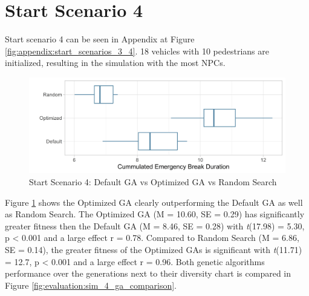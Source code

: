 \section{Start Scenario 4}
Start scenario 4 can be seen in Appendix at Figure \ref{fig:appendix:start_scenarios_3_4}. 18 vehicles with 10 pedestrians are initialized, resulting in the simulation with the most NPCs.

\begin{figure}[ht] 
	\includegraphics[width=1\linewidth]{simulations/evaluation/plots/sim_4_comparison}
	\caption{Start Scenario 4: Default GA vs Optimized GA vs Random Search}
	\label{fig:evaluation:sim_4_comparison}
\end{figure}

Figure \ref{fig:evaluation:sim_4_comparison} shows the Optimized GA clearly outperforming the Default GA as well as Random Search.
The Optimized GA (M = 10.60, SE = 0.29) has significantly greater fitness then the Default GA (M = 8.46, SE = 0.28) with \textit{t}(17.98) = 5.30, p < 0.001 and a large effect r = 0.78.
Compared to Random Search (M = 6.86, SE = 0.14), the greater fitness of the Optimized GAs is significant with \textit{t}(11.71) = 12.7, p < 0.001 and a large effect r = 0.96. Both genetic algorithms performance over the generations next to their diversity chart is compared in Figure \ref{fig:evaluation:sim_4_ga_comparison}.


